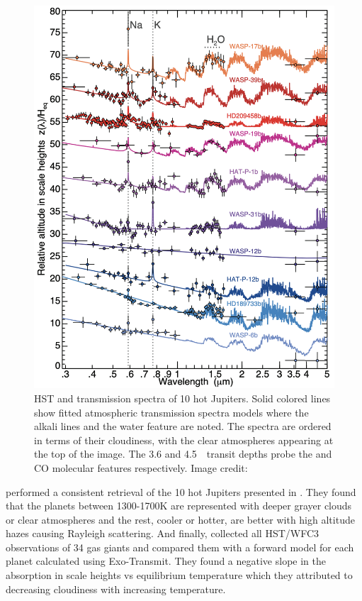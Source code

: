 \begin{figure}
    \centering
    \includegraphics[width = \linewidth]{singetal.png}
    \caption{HST and \spitzer transmission spectra of 10 hot Jupiters. Solid colored lines show fitted atmospheric transmission spectra models where the alkali lines and the water feature are noted. The spectra are ordered in terms of their cloudiness, with the clear atmospheres appearing at the top of the image. The 3.6 and 4.5~\um~\spitzerIRAC transit depths probe the  and CO molecular features respectively. Image credit: \citet{Sing2016}}
    \label{int:fig:singetal}
\end{figure}

\citet{Barstow2017} performed a consistent retrieval of the 10 hot Jupiters presented in \citet{Sing2016}. They found that the planets between 1300-1700K are represented with deeper grayer clouds or clear atmospheres and the rest, cooler or hotter, are better with high altitude hazes causing Rayleigh scattering. And finally, \citet{Fu2017} collected all HST/WFC3 observations of 34 gas giants and compared them with a forward model for each planet calculated using Exo-Transmit. They found a negative slope in the absorption in scale heights vs equilibrium temperature which they attributed to decreasing cloudiness with increasing temperature.

